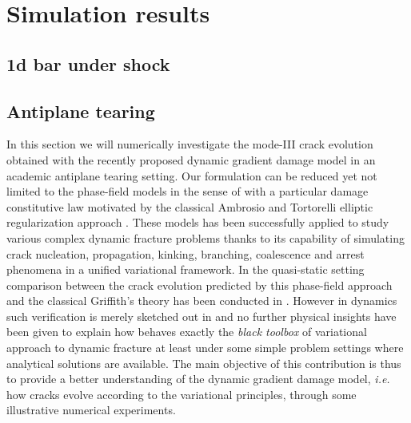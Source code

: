 \chapter{Simulation results}
\minitoc

\section{1d bar under shock}
\blindtext

\section{Antiplane tearing}
In this section we will numerically investigate the mode-\RN{3} crack evolution obtained with the recently proposed dynamic gradient damage model \cite{LiMarigo:2015} in an academic antiplane tearing setting. Our formulation can be reduced yet not limited to the phase-field models in the sense of \cite{HofackerMiehe:2012,BordenVerhooselScottHughesLandis:2012,SchlueterWillenbuecherKuhnMueller:2014} with a particular damage constitutive law motivated by the classical Ambrosio and Tortorelli elliptic regularization approach \cite{BourdinFrancfortMarigo:2000}. These models has been successfully applied to study various complex dynamic fracture problems thanks to its capability of simulating crack nucleation, propagation, kinking, branching, coalescence and arrest phenomena in a unified variational framework. In the quasi-static setting comparison between the crack evolution predicted by this phase-field approach and the classical Griffith's theory has been conducted in \cite{klinsmann2015assessment}. However in dynamics such verification is merely sketched out in \cite{Bourdin:2011} and no further physical insights have been given to explain how behaves exactly the \emph{black toolbox} of variational approach to dynamic fracture at least under some simple problem settings where analytical solutions are available. The main objective of this contribution is thus to provide a better understanding of the dynamic gradient damage model, \emph{i.e.} how cracks evolve according to the variational principles, through some illustrative numerical experiments.


